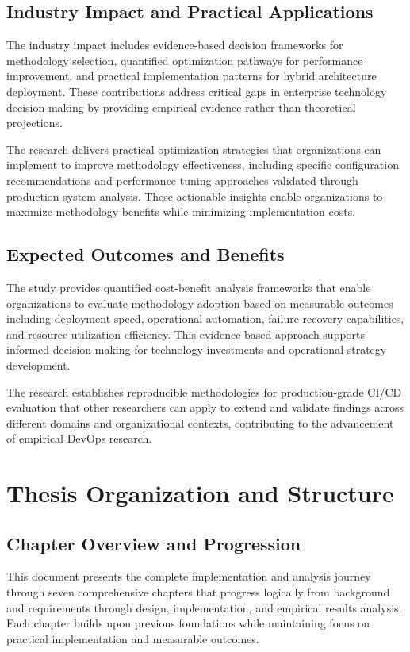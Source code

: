 \subsection{Industry Impact and Practical Applications}
The industry impact includes evidence-based decision frameworks for methodology selection, quantified optimization pathways for performance improvement, and practical implementation patterns for hybrid architecture deployment. These contributions address critical gaps in enterprise technology decision-making by providing empirical evidence rather than theoretical projections.

The research delivers practical optimization strategies that organizations can implement to improve methodology effectiveness, including specific configuration recommendations and performance tuning approaches validated through production system analysis. These actionable insights enable organizations to maximize methodology benefits while minimizing implementation costs.

\subsection{Expected Outcomes and Benefits}
The study provides quantified cost-benefit analysis frameworks that enable organizations to evaluate methodology adoption based on measurable outcomes including deployment speed, operational automation, failure recovery capabilities, and resource utilization efficiency. This evidence-based approach supports informed decision-making for technology investments and operational strategy development.

The research establishes reproducible methodologies for production-grade CI/CD evaluation that other researchers can apply to extend and validate findings across different domains and organizational contexts, contributing to the advancement of empirical DevOps research.

\section{Thesis Organization and Structure}

\subsection{Chapter Overview and Progression}
This document presents the complete implementation and analysis journey through seven comprehensive chapters that progress logically from background and requirements through design, implementation, and empirical results analysis. Each chapter builds upon previous foundations while maintaining focus on practical implementation and measurable outcomes.

